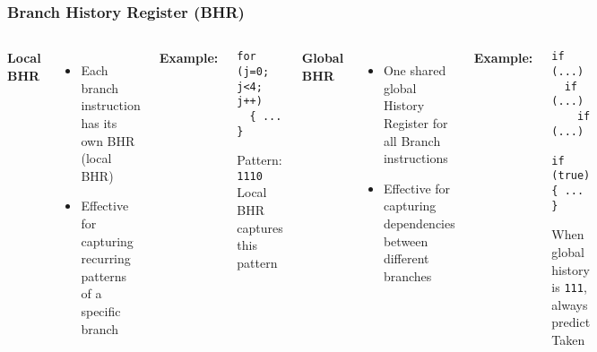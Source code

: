 \documentclass[aspectratio=169,12pt]{beamer}
\begin{document}
\begin{frame}[fragile]
  \frametitle{Branch History Register (BHR)}

  \vspace{-0.3cm}
  \begin{columns}[t]
    \textbf{\large Local BHR}
    \vspace{0.3em}
    \begin{itemize}
      \item Each branch instruction has its own BHR (local BHR)
      \item Effective for capturing recurring patterns of a specific branch
    \end{itemize}

    \textbf{Example:}
    \begin{tcolorbox}[colback=green!5, colframe=green!40, boxrule=0.8pt]
      \small
\begin{verbatim}
for (j=0; j<4; j++)
  { ... }
\end{verbatim}
      \vspace{-0.5em}
      Pattern: \texttt{1110}\\
      Local BHR captures this pattern
    \end{tcolorbox}

    \textbf{\large Global BHR}
    \vspace{0.3em}
    \begin{itemize}
      \item One shared global History Register for all Branch instructions
      \item Effective for capturing dependencies between different branches
    \end{itemize}

    \textbf{Example:}
    \begin{tcolorbox}[colback=blue!5, colframe=blue!40, boxrule=0.8pt]
      \small
\begin{verbatim}
if (...)
  if (...)
    if (...)
      if (true) { ... }
\end{verbatim}
      \vspace{-0.5em}
      When global history is \texttt{111}, always predict Taken
    \end{tcolorbox}
  \end{columns}
\end{frame}
\end{document}
